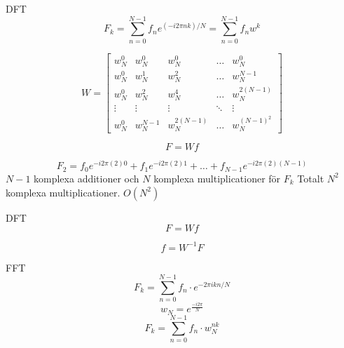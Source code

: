 \documentclass[presentation]{beamer}
\begin{document}
\begin{frame}[label={sec:org460ada6}]{DFT}
\begin{equation*}
F_{k} = \sum_{n=0}^{N-1} f_{n} e^{(-i2 \pi nk)/N} = \sum_{n=0}^{N-1} f_{n} w^{k}
\end{equation*}

\begin{equation*}
W =
\begin{bmatrix}
  w_{N}^{0} & w_{N}^{0} & w_{N}^{0} & \dots & w_{N}^{0} \\
  w_{N}^{0} & w_{N}^{1} & w_{N}^{2} & \dots & w_{N}^{N-1} \\
  w_{N}^{0} & w_{N}^{2} & w_{N}^{4} & \dots & w_{N}^{2(N-1)} \\
  \vdots & \vdots & \vdots       & \ddots & \vdots \\  
  w_{N}^{0} & w_{N}^{N-1} & w_{N}^{2(N-1)} & \dots & w_{N}^{(N-1)^{2}}
\end{bmatrix}
\end{equation*}

\begin{equation*}
F = Wf
\end{equation*}

\begin{equation*}
F_{2} = f_{0}e^{-i2 \pi (2)0} + f_{1}e^{-i2 \pi (2)1} + \dots + f_{N-1}e^{-i2 \pi (2)(N-1)}
\end{equation*}
\(N - 1\) komplexa additioner och \(N\) komplexa multiplicationer för \(F_{k}\)
Totalt \(N^{2}\) komplexa multiplicationer. \(O(N^{2})\)
\end{frame}

\begin{frame}[label={sec:orgbc6d34e}]{DFT}
\begin{equation*}
F = Wf
\end{equation*}

\begin{equation*}
f = W^{-1}F
\end{equation*}
\end{frame}

\begin{frame}[label={sec:org3c72afc}]{FFT}
\[ F_{k} = \sum_{n=0}^{N-1} f_{n} \cdot e^{-2 \pi i kn/N}\]
\pause
\[ w_{N} = e^{\frac{-i2 \pi}{N}} \]
\pause
\[ F_{k} = \sum_{n=0}^{N-1} f_{n} \cdot w_{N}^{nk} \]
\end{frame}
\end{document}
